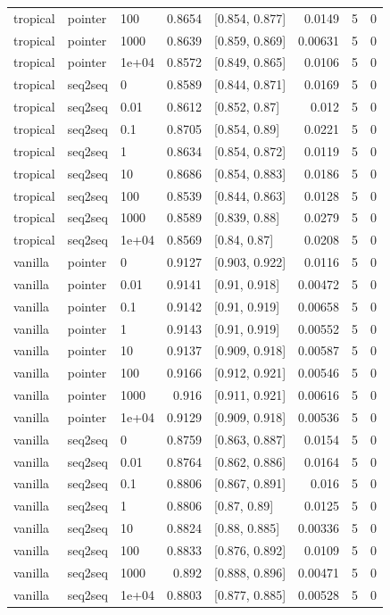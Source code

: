 \documentclass[10pt]{article}
\begin{document}
{\begin{longtable}{lllrlrrr}
tropical & pointer & 100 & 0.8654 & [0.854, 0.877] & 0.0149 & 5 & 0\\
tropical & pointer & 1000 & 0.8639 & [0.859, 0.869] & 0.00631 & 5 & 0\\
tropical & pointer & 1e+04 & 0.8572 & [0.849, 0.865] & 0.0106 & 5 & 0\\
tropical & seq2seq & 0 & 0.8589 & [0.844, 0.871] & 0.0169 & 5 & 0\\
tropical & seq2seq & 0.01 & 0.8612 & [0.852, 0.87] & 0.012 & 5 & 0\\
tropical & seq2seq & 0.1 & 0.8705 & [0.854, 0.89] & 0.0221 & 5 & 0\\
tropical & seq2seq & 1 & 0.8634 & [0.854, 0.872] & 0.0119 & 5 & 0\\
tropical & seq2seq & 10 & 0.8686 & [0.854, 0.883] & 0.0186 & 5 & 0\\
tropical & seq2seq & 100 & 0.8539 & [0.844, 0.863] & 0.0128 & 5 & 0\\
tropical & seq2seq & 1000 & 0.8589 & [0.839, 0.88] & 0.0279 & 5 & 0\\
tropical & seq2seq & 1e+04 & 0.8569 & [0.84, 0.87] & 0.0208 & 5 & 0\\
vanilla & pointer & 0 & 0.9127 & [0.903, 0.922] & 0.0116 & 5 & 0\\
vanilla & pointer & 0.01 & 0.9141 & [0.91, 0.918] & 0.00472 & 5 & 0\\
vanilla & pointer & 0.1 & 0.9142 & [0.91, 0.919] & 0.00658 & 5 & 0\\
vanilla & pointer & 1 & 0.9143 & [0.91, 0.919] & 0.00552 & 5 & 0\\
vanilla & pointer & 10 & 0.9137 & [0.909, 0.918] & 0.00587 & 5 & 0\\
vanilla & pointer & 100 & 0.9166 & [0.912, 0.921] & 0.00546 & 5 & 0\\
vanilla & pointer & 1000 & 0.916 & [0.911, 0.921] & 0.00616 & 5 & 0\\
vanilla & pointer & 1e+04 & 0.9129 & [0.909, 0.918] & 0.00536 & 5 & 0\\
vanilla & seq2seq & 0 & 0.8759 & [0.863, 0.887] & 0.0154 & 5 & 0\\
vanilla & seq2seq & 0.01 & 0.8764 & [0.862, 0.886] & 0.0164 & 5 & 0\\
vanilla & seq2seq & 0.1 & 0.8806 & [0.867, 0.891] & 0.016 & 5 & 0\\
vanilla & seq2seq & 1 & 0.8806 & [0.87, 0.89] & 0.0125 & 5 & 0\\
vanilla & seq2seq & 10 & 0.8824 & [0.88, 0.885] & 0.00336 & 5 & 0\\
vanilla & seq2seq & 100 & 0.8833 & [0.876, 0.892] & 0.0109 & 5 & 0\\
vanilla & seq2seq & 1000 & 0.892 & [0.888, 0.896] & 0.00471 & 5 & 0\\
vanilla & seq2seq & 1e+04 & 0.8803 & [0.877, 0.885] & 0.00528 & 5 & 0\\
\bottomrule
\end{longtable}
}
\end{document}
